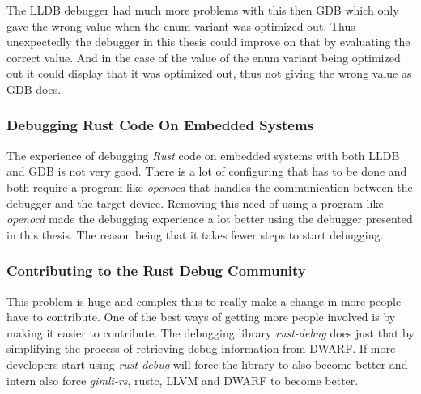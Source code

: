 The \gls{LLDB} debugger had much more problems with this then \gls{GDB} which only gave the wrong value when the enum variant was optimized out.
Thus unexpectedly the debugger in this thesis could improve on that by evaluating the correct value.
And in the case of the value of the  enum variant being optimized out it could display that it was optimized out, thus not giving the wrong value as \gls{GDB} does.


\subsubsection{Debugging Rust Code On Embedded Systems}
The experience of debugging \emph{Rust} code on embedded systems with both \gls{LLDB} and \gls{GDB} is not very good.
There is a lot of configuring that has to be done and both require a program like \emph{openocd} that handles the communication between the debugger and the target device.
Removing this need of using a program like \emph{openocd} made the debugging experience a lot better using the debugger presented in this thesis.
The reason being that it takes fewer steps to start debugging.


\subsubsection{Contributing to the Rust Debug Community}
This problem is huge and complex thus to really make a change in more people have to contribute.
One of the best ways of getting more people involved is by making it easier to contribute.
The debugging library \emph{rust-debug} does just that by simplifying the process of retrieving debug information from \gls{DWARF}.
If more developers start using \emph{rust-debug} will force the library to also become better and intern also force \emph{gimli-rs}, \gls{rustc}, \gls{LLVM} and \gls{DWARF} to become better.

